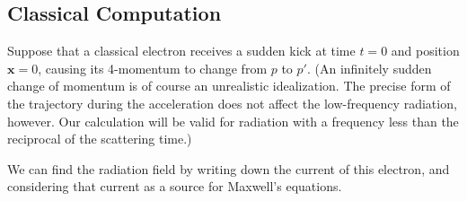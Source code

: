 \subsection{Classical Computation}

Suppose that a classical electron receives a sudden kick at time $t=0$ and
position $\mathbf{x}=0$, causing its 4-momentum to change from $p$ to $p'$.
(An infinitely sudden change of momentum is of course an unrealistic
idealization.  The precise form of the trajectory during the acceleration
does not affect the low-frequency radiation, however.  Our calculation will be
valid for radiation with a frequency less than the reciprocal of the
scattering time.)

We can find the radiation field by writing down the current of this electron,
and considering that current as a source for Maxwell's equations.


